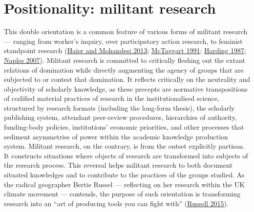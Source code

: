 \documentclass[a4paper, nobind]{templates/ociamthesis}
\begin{document}
\hypertarget{positionality-militant-research}{%
\section{Positionality: militant research}\label{positionality-militant-research}}

This double orientation is a common feature of various forms of militant research --- ranging from worker's inquiry, over participatory action research, to feminist standpoint research (\protect\hyperlink{ref-haier_workers_2013}{Haier and Mohandesi 2013}; \protect\hyperlink{ref-mctaggart_principles_1991}{McTaggart 1991}; \protect\hyperlink{ref-harding_feminism_1987}{Harding 1987}; \protect\hyperlink{ref-naples_feminist_2007}{Naples 2007}). Militant research is committed to critically fleshing out the extant relations of domination while directly augmenting the agency of groups that are subjected to or contest that domination. It reflects critically on the neutrality and objectivity of scholarly knowledge, as these precepts are normative transpositions of codified material practices of research in the institutionalised science, structured by research formats (including the long-form thesis), the scholarly publishing system, attendant peer-review procedures, hierarchies of authority, funding-body policies, institutions' economic priorities, and other processes that sediment asymmetries of power within the academic knowledge production system. Militant research, on the contrary, is from the outset explicitly partisan. It constructs situations where objects of research are transformed into subjects of the research process. This reversal helps militant research to both document situated knowledges and to contribute to the practices of the groups studied. As the radical geographer Bertie Russel --- reflecting on her research within the UK climate movement --- contends, the purpose of such orientation is transforming research into an ``art of producing tools you can fight with'' (\protect\hyperlink{ref-russell_activismacademia_2015}{Russell 2015}).
\end{document}
